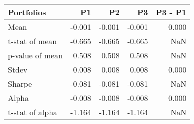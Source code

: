 \begin{tabular}{lrrrr}
\toprule
Portfolios & P1 & P2 & P3 & P3 - P1 \\
\midrule
Mean & -0.001 & -0.001 & -0.001 & 0.000 \\
t-stat of mean & -0.665 & -0.665 & -0.665 & NaN \\
p-value of mean & 0.508 & 0.508 & 0.508 & NaN \\
Stdev & 0.008 & 0.008 & 0.008 & 0.000 \\
Sharpe & -0.081 & -0.081 & -0.081 & NaN \\
Alpha & -0.008 & -0.008 & -0.008 & 0.000 \\
t-stat of alpha & -1.164 & -1.164 & -1.164 & NaN \\
\bottomrule
\end{tabular}
